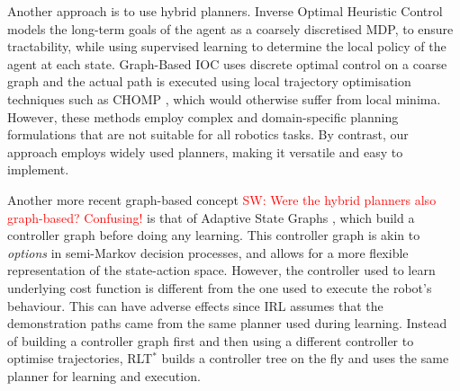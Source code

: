 \documentclass{article}  %
\newcommand{\sw}[1]{\textcolor{red}{SW: #1}}
\begin{document}
Another approach is to use hybrid planners. Inverse Optimal Heuristic Control \cite{ratliff2009inverse} models the long-term goals of the agent as a coarsely discretised MDP, to ensure tractability, while using supervised learning to determine the local policy of the agent at each state. Graph-Based IOC \cite{byravan2015graph} uses discrete optimal control on a coarse graph and the actual path is executed using local trajectory optimisation techniques such as CHOMP \cite{ratliff2009chomp}, which would otherwise suffer from local minima. However, these methods employ complex and domain-specific planning formulations that are not suitable for all robotics tasks. By contrast, our approach employs widely used planners, making it versatile and easy to implement. 

Another more recent graph-based concept \sw{Were the hybrid planners also graph-based? Confusing!} is that of Adaptive State Graphs \cite{okallearning}, which build a controller graph before doing any learning. This controller graph is akin to \emph{options} in semi-Markov decision processes, and allows for a more flexible representation of the state-action space. However, the controller used to learn underlying cost function is different from the one used to execute the robot's behaviour. This can have adverse effects since IRL  assumes that the demonstration paths came from the same planner used during learning.  Instead of building a controller graph first and then using a different controller to optimise trajectories, RLT$^*$ builds a controller tree on the fly and uses the same planner for learning and execution.
\end{document}

